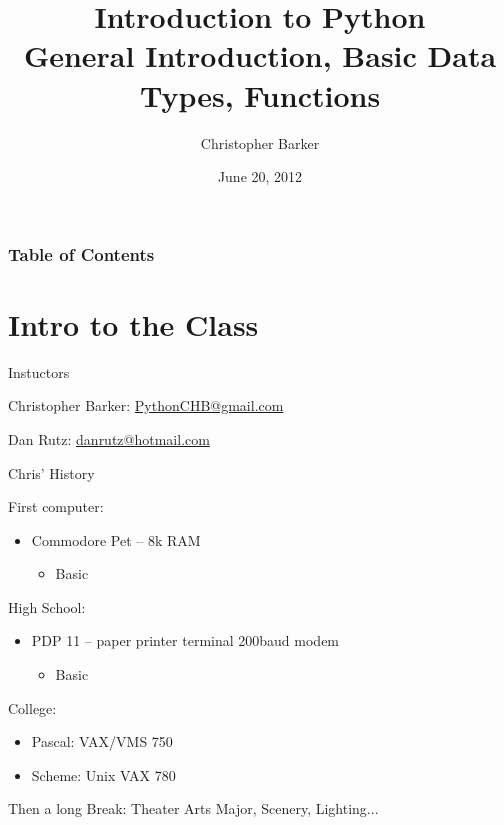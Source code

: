 \documentclass{beamer}
\title[Intro to Python: Week 1]{Introduction  to Python\\ General Introduction, Basic Data Types, Functions}
\author{Christopher Barker}
\institute{UW Continuing Education / Isilon}
\date{June 20, 2012}
\begin{document}
\begin{frame}
\titlepage
\end{frame}

\begin{frame}
\frametitle{Table of Contents}
\tableofcontents
\end{frame}

\section{Intro to the Class}

\begin{frame}{Instuctors}

Christopher Barker: \url{PythonCHB@gmail.com}

\vspace{0.5 in}

Dan Rutz: \url{danrutz@hotmail.com}

\end{frame}


\begin{frame}{Chris' History}

{\Large First computer:}
\begin{itemize}
  \item Commodore Pet -- 8k RAM
  \begin{itemize}
    \item  Basic
  \end{itemize}
\end{itemize}


{\Large High School:}
\begin{itemize}
  \item PDP 11 -- paper printer terminal 200baud modem 
  \begin{itemize}
    \item  Basic
  \end{itemize}
\end{itemize}

\pause

{\Large College: }
\begin{itemize}
  \item Pascal:  VAX/VMS  750 
  \item Scheme:  Unix VAX 780
\end{itemize}

\vspace{0.25in}

\pause

Then a long Break: Theater Arts Major, Scenery, Lighting...

\end{frame}
\end{document}
